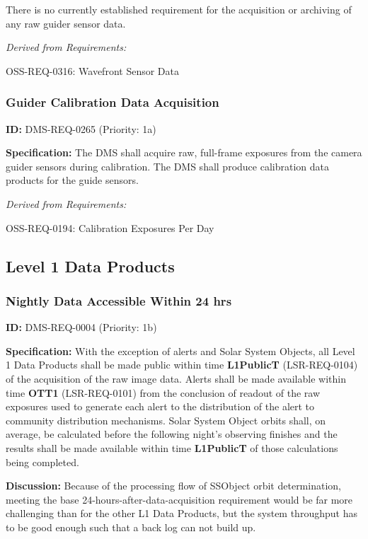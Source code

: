 \documentclass[SE,toc,lsstdraft]{lsstdoc}
\begin{document}
There is no currently established requirement for the acquisition or archiving of any raw guider sensor data.

\emph{Derived from Requirements:}

OSS-REQ-0316:
Wavefront Sensor Data \newline

\subsubsection{Guider Calibration Data Acquisition}

\label{DMS-REQ-0265}
\textbf{ID:} DMS-REQ-0265 (Priority: 1a)

\textbf{Specification:} The DMS shall acquire raw, full-frame exposures from the camera guider sensors during calibration. The DMS shall produce calibration data products for the guide sensors.

\emph{Derived from Requirements:}

OSS-REQ-0194:
Calibration Exposures Per Day \newline

\subsection{Level 1 Data Products}

\subsubsection{Nightly Data Accessible Within 24 hrs}

\label{DMS-REQ-0004}
\textbf{ID:} DMS-REQ-0004 (Priority: 1b)

\textbf{Specification:} With the exception of alerts and Solar System Objects, all Level 1 Data Products shall be made public within time \textbf{L1PublicT} (LSR-REQ-0104) of the acquisition of the raw image data. Alerts shall be made available within time \textbf{OTT1} (LSR-REQ-0101) from the conclusion of readout of the raw exposures used to generate each alert to the distribution of the alert to community distribution mechanisms.  Solar System Object orbits shall, on average, be calculated before the following night's observing finishes and the results shall be made available within time \textbf{L1PublicT} of those calculations being completed.

\textbf{Discussion:} Because of the processing flow of SSObject orbit determination, meeting the base 24-hours-after-data-acquisition requirement would be far more challenging than for the other L1 Data Products, but the system throughput has to be good enough such that a back log can not build up.
\end{document}
